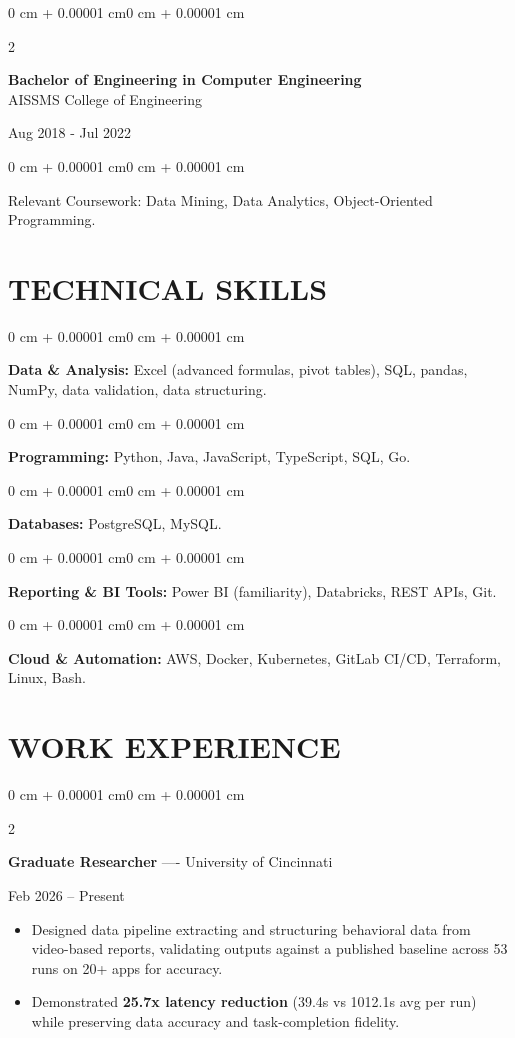 \documentclass[10pt, letterpaper]{article}
\newenvironment{highlights}{
    \begin{itemize}[
        topsep=0.10 cm,
        parsep=0.06 cm,
        partopsep=0pt,
        itemsep=0.06 cm,
        leftmargin=12pt
    ]
}{
    \end{itemize}
}
\newenvironment{onecolentry}{
    \begin{adjustwidth}{0 cm + 0.00001 cm}{0 cm + 0.00001 cm}
}{
    \end{adjustwidth}
}
\newenvironment{twocolentry}[2][]{
    \onecolentry
    \def\secondColumn{#2}
    \setcolumnwidth{\fill, 4.5 cm}
    \begin{paracol}{2}
}{
    \switchcolumn \raggedleft \secondColumn
    \end{paracol}
    \endonecolentry
}
\begin{document}
\begin{twocolentry}{
    Aug 2018 - Jul 2022
}
    \textbf{Bachelor of Engineering in Computer Engineering} \\
    AISSMS College of Engineering
\end{twocolentry}
\begin{onecolentry}
Relevant Coursework: Data Mining, Data Analytics, Object-Oriented Programming.
\end{onecolentry}
\section{TECHNICAL SKILLS}
\begin{onecolentry}
\textbf{Data \& Analysis:} Excel (advanced formulas, pivot tables), SQL, pandas, NumPy, data validation, data structuring.
\end{onecolentry}
\vspace{0.06 cm}
\begin{onecolentry}
\textbf{Programming:} Python, Java, JavaScript, TypeScript, SQL, Go.
\end{onecolentry}
\vspace{0.06 cm}
\begin{onecolentry}
\textbf{Databases:} PostgreSQL, MySQL.
\end{onecolentry}
\vspace{0.06 cm}
\begin{onecolentry}
\textbf{Reporting \& BI Tools:} Power BI (familiarity), Databricks, REST APIs, Git.
\end{onecolentry}
\vspace{0.06 cm}
\begin{onecolentry}
\textbf{Cloud \& Automation:} AWS, Docker, Kubernetes, GitLab CI/CD, Terraform, Linux, Bash.
\end{onecolentry}

\section{WORK EXPERIENCE}
\begin{twocolentry}{Feb 2026 -- Present}
\textbf{Graduate Researcher} ---- University of Cincinnati
\end{twocolentry}
\begin{highlights}
  \item Designed data pipeline extracting and structuring behavioral data from video-based reports, validating outputs against a published baseline across 53 runs on 20+ apps for accuracy.
  \item Demonstrated \textbf{25.7x latency reduction} (39.4s vs 1012.1s avg per run) while preserving data accuracy and task-completion fidelity.
\end{highlights}
\end{document}
